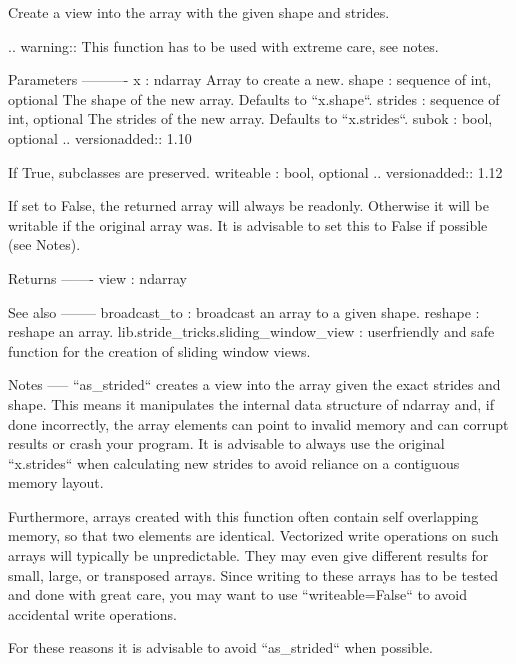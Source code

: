 \begin{DoxyVerb}Create a view into the array with the given shape and strides.

.. warning:: This function has to be used with extreme care, see notes.

Parameters
----------
x : ndarray
    Array to create a new.
shape : sequence of int, optional
    The shape of the new array. Defaults to ``x.shape``.
strides : sequence of int, optional
    The strides of the new array. Defaults to ``x.strides``.
subok : bool, optional
    .. versionadded:: 1.10

    If True, subclasses are preserved.
writeable : bool, optional
    .. versionadded:: 1.12

    If set to False, the returned array will always be readonly.
    Otherwise it will be writable if the original array was. It
    is advisable to set this to False if possible (see Notes).

Returns
-------
view : ndarray

See also
--------
broadcast_to : broadcast an array to a given shape.
reshape : reshape an array.
lib.stride_tricks.sliding_window_view :
    userfriendly and safe function for the creation of sliding window views.

Notes
-----
``as_strided`` creates a view into the array given the exact strides
and shape. This means it manipulates the internal data structure of
ndarray and, if done incorrectly, the array elements can point to
invalid memory and can corrupt results or crash your program.
It is advisable to always use the original ``x.strides`` when
calculating new strides to avoid reliance on a contiguous memory
layout.

Furthermore, arrays created with this function often contain self
overlapping memory, so that two elements are identical.
Vectorized write operations on such arrays will typically be
unpredictable. They may even give different results for small, large,
or transposed arrays.
Since writing to these arrays has to be tested and done with great
care, you may want to use ``writeable=False`` to avoid accidental write
operations.

For these reasons it is advisable to avoid ``as_strided`` when
possible.
\end{DoxyVerb}
 \mbox{\label{namespacenumpy_1_1lib_1_1stride__tricks_a0819d44b8262c334f381ed9b9fe1449f}} 
